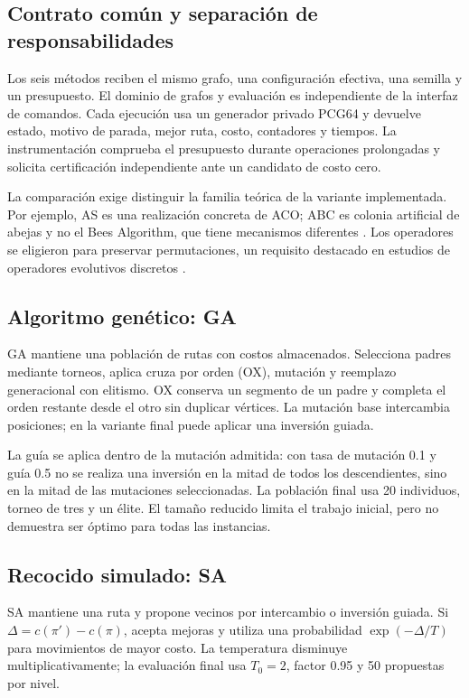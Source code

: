 \subsection{Contrato común y separación de responsabilidades}
Los seis métodos reciben el mismo grafo, una configuración efectiva, una semilla y un presupuesto. El dominio de grafos y evaluación es independiente de la interfaz de comandos. Cada ejecución usa un generador privado PCG64 y devuelve estado, motivo de parada, mejor ruta, costo, contadores y tiempos. La instrumentación comprueba el presupuesto durante operaciones prolongadas y solicita certificación independiente ante un candidato de costo cero.

La comparación exige distinguir la familia teórica de la variante implementada. Por ejemplo, AS es una realización concreta de ACO; ABC es colonia artificial de abejas y no el Bees Algorithm, que tiene mecanismos diferentes \citep{dorigoStuetzle2003Aco,karaboga2005Abc,yuce2013Bees}. Los operadores se eligieron para preservar permutaciones, un requisito destacado en estudios de operadores evolutivos discretos \citep{cicirello2023PermutationOperators}.

\subsection{Algoritmo genético: GA}
GA mantiene una población de rutas con costos almacenados. Selecciona padres mediante torneos, aplica cruza por orden (OX), mutación y reemplazo generacional con elitismo. OX conserva un segmento de un padre y completa el orden restante desde el otro sin duplicar vértices. La mutación base intercambia posiciones; en la variante final puede aplicar una inversión guiada.

La guía se aplica dentro de la mutación admitida: con tasa de mutación 0.1 y guía 0.5 no se realiza una inversión en la mitad de todos los descendientes, sino en la mitad de las mutaciones seleccionadas. La población final usa 20 individuos, torneo de tres y un élite. El tamaño reducido limita el trabajo inicial, pero no demuestra ser óptimo para todas las instancias.

\subsection{Recocido simulado: SA}
SA mantiene una ruta y propone vecinos por intercambio o inversión guiada. Si $\Delta=c(\pi')-c(\pi)$, acepta mejoras y utiliza una probabilidad $\exp(-\Delta/T)$ para movimientos de mayor costo. La temperatura disminuye multiplicativamente; la evaluación final usa $T_0=2$, factor 0.95 y 50 propuestas por nivel.


